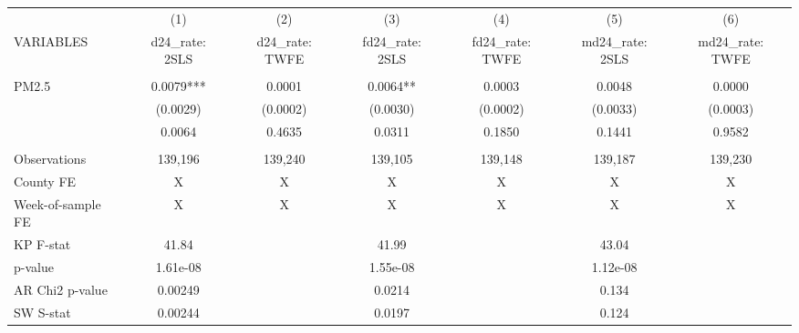 \begin{tabular}{lcccccc} \hline
 & (1) & (2) & (3) & (4) & (5) & (6) \\
VARIABLES & d24\_rate: 2SLS & d24\_rate: TWFE & fd24\_rate: 2SLS & fd24\_rate: TWFE & md24\_rate: 2SLS & md24\_rate: TWFE \\ \hline
 &  &  &  &  &  &  \\
PM2.5 & 0.0079*** & 0.0001 & 0.0064** & 0.0003 & 0.0048 & 0.0000 \\
 & (0.0029) & (0.0002) & (0.0030) & (0.0002) & (0.0033) & (0.0003) \\
 & 0.0064 & 0.4635 & 0.0311 & 0.1850 & 0.1441 & 0.9582 \\
 &  &  &  &  &  &  \\
Observations & 139,196 & 139,240 & 139,105 & 139,148 & 139,187 & 139,230 \\
County FE & X & X & X & X & X & X \\
Week-of-sample FE & X & X & X & X & X & X \\
KP F-stat & 41.84 &  & 41.99 &  & 43.04 &  \\
p-value & 1.61e-08 &  & 1.55e-08 &  & 1.12e-08 &  \\
AR Chi2 p-value & 0.00249 &  & 0.0214 &  & 0.134 &  \\
 SW S-stat & 0.00244 &  & 0.0197 &  & 0.124 &  \\ \hline
\end{tabular}
